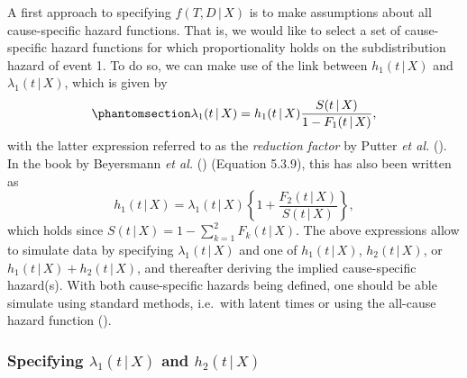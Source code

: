 \documentclass[
  letterpaper,
  paper=240mm:170mm,
  twoside=true,
  open=right,
  fontsize=10pt,
  pagesize=false,
  BCOR=15mm,
  DIV=14,
  headinclude=true,
  footinclude=false,
  headsepline=on]{scrbook}
\newcommand{\given}{\,|\,}
\begin{document}
A first approach to specifying \(f(T, D \given X)\) is to make
assumptions about all cause-specific hazard functions. That is, we would
like to select a set of cause-specific hazard functions for which
proportionality holds on the subdistribution hazard of event 1. To do
so, we can make use of the link between \(h_1(t \given X)\) and
\(\lambda_1(t \given X)\), which is given by
\begin{equation}\phantomsection\label{eq-reduc}{
\lambda_1(t \given X) = h_1(t \given X)\frac{S(t \given X)}{1 - F_1(t \given X)},
}\end{equation} with the latter expression referred to as the
\textit{reduction factor} by Putter \emph{et al.}
(). In the
book by Beyersmann \emph{et al.}
() (Equation
5.3.9), this has also been written as \begin{equation*}
    h_1(t \given X) = \lambda_1(t \given X)\left\{1 + \frac{F_2(t \given X)}{S(t \given X)}\right\},
\end{equation*} which holds since
\(S(t \given X) = 1 - \sum_{k=1}^2F_k(t \given X)\). The above
expressions allow to simulate data by specifying
\(\lambda_1(t \given X)\) and one of \(h_1(t \given X)\),
\(h_2(t \given X)\), or \(h_1(t \given X) + h_2(t \given X)\), and
thereafter deriving the implied cause-specific hazard(s). With both
cause-specific hazards being defined, one should be able simulate using
standard methods, i.e.~with latent times or using the all-cause hazard
function
().

\subsubsection{\texorpdfstring{Specifying \(\lambda_1(t \given X)\) and
\(h_2(t \given X)\)}{Specifying \textbackslash lambda\_1(t \textbackslash given X) and h\_2(t \textbackslash given X)}}\label{sec-reduct-int}
\end{document}
